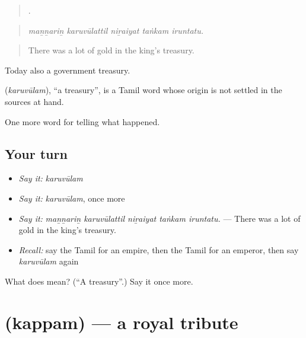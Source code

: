 \begin{quote}
    .
\end{quote}

\begin{quote}
\emph{maṉṉariṉ karuvūlattil niṟaiyat taṅkam iruntatu.}
\end{quote}

\begin{quote}
There was a lot of gold in the king's treasury.
\end{quote}

Today also a government treasury.

\begin{cousinweb}
\textbf{} (\emph{karuvūlam}), \textquotedblleft{}a treasury\textquotedblright{}, is a Tamil word whose origin is not settled in the sources at hand.
\end{cousinweb}

\begin{grammarlens}[title={What you've built}]
One more word for telling what happened.
\end{grammarlens}

\subsection*{Your turn}
\begin{itemize}
\raggedright
  \item \emph{Say it:} \emph{karuvūlam}
  \item \emph{Say it:} \emph{karuvūlam}, once more
  \item \emph{Say it:} \emph{maṉṉariṉ karuvūlattil niṟaiyat taṅkam iruntatu.} — There was a lot of gold in the king's treasury.
  \item \emph{Recall:} say the Tamil for an empire, then the Tamil for an emperor, then say \emph{karuvūlam} again
\end{itemize}

\begin{tcolorbox}[breakable,colback=teal!4,colframe=teal!35!black,title={Before you move on}]
What does  mean? (\textquotedblleft{}A treasury\textquotedblright{}.) Say it once more.
\end{tcolorbox}
\section[\texorpdfstring{\ta{கப்பம்} (kappam)}{கப்பம் (kappam)}]{ (kappam) — a royal tribute}

